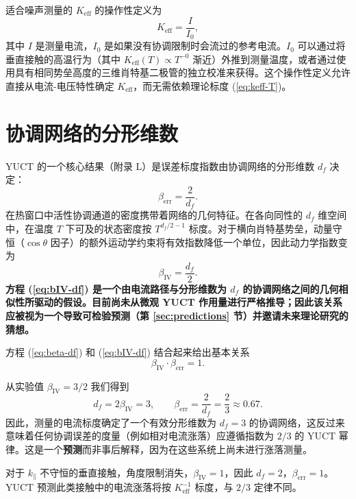 \documentclass[12pt,a4paper]{article}
\newcommand{\Keff}{K_{\mathrm{eff}}}
\begin{document}
	适合噪声测量的 $\Keff$ 的操作性定义为
	\begin{equation}
		\Keff = \frac{I}{I_0},
		\label{eq:keff-operational}
	\end{equation}
	其中 $I$ 是测量电流，$I_0$ 是如果没有协调限制时会流过的参考电流。$I_0$ 可以通过将垂直接触的高温行为（其中 $\Keff(T) \propto T^{-0}$ 渐近）外推到测量温度，或者通过使用具有相同势垒高度的三维肖特基二极管的独立校准来获得。这个操作性定义允许直接从电流-电压特性确定 $\Keff$，而无需依赖理论标度 (\ref{eq:keff-T})。
	
	\section{协调网络的分形维数}
	
	YUCT 的一个核心结果（附录 L）是误差标度指数由协调网络的分形维数 $d_f$ 决定：
	\begin{equation}
		\beta_{\mathrm{err}} = \frac{2}{d_f}.
		\label{eq:beta-df}
	\end{equation}
	在热窗口中活性协调通道的密度携带着网络的几何特征。在各向同性的 $d_f$ 维空间中，在温度 $T$ 下可及的状态密度按 $T^{d_f/2 - 1}$ 标度。对于横向肖特基势垒，动量守恒（$\cos\theta$ 因子）的额外运动学约束将有效指数降低一个单位，因此动力学指数变为
	\begin{equation}
		\beta_{\mathrm{IV}} = \frac{d_f}{2}.
		\label{eq:bIV-df}
	\end{equation}
	\textbf{方程 (\ref{eq:bIV-df}) 是一个由电流路径与分形维数为 $d_f$ 的协调网络之间的几何相似性所驱动的假设。目前尚未从微观 YUCT 作用量进行严格推导；因此该关系应被视为一个导致可检验预测（第 \ref{sec:predictions} 节）并邀请未来理论研究的猜想。}
	
	方程 (\ref{eq:beta-df}) 和 (\ref{eq:bIV-df}) 结合起来给出基本关系
	\begin{equation}
		\boxed{\beta_{\mathrm{IV}} \cdot \beta_{\mathrm{err}} = 1}.
		\label{eq:relation}
	\end{equation}
	
	从实验值 $\beta_{\mathrm{IV}} = 3/2$ 我们得到
	\begin{equation}
		d_f = 2\beta_{\mathrm{IV}} = 3, \qquad
		\beta_{\mathrm{err}} = \frac{2}{d_f} = \frac{2}{3} \approx 0.67.
	\end{equation}
	因此，测量的电流标度确定了一个有效分形维数为 $d_f = 3$ 的协调网络，这反过来意味着任何协调误差的度量（例如相对电流涨落）应遵循指数为 $2/3$ 的 YUCT 幂律。这是一个\textbf{预测}而非事后解释，因为在这些系统上尚未进行涨落测量。
	
	对于 $k_\parallel$ 不守恒的垂直接触，角度限制消失，$\beta_{\mathrm{IV}} = 1$，因此 $d_f = 2$，$\beta_{\mathrm{err}} = 1$。YUCT 预测此类接触中的电流涨落将按 $\Keff^{-1}$ 标度，与 $2/3$ 定律不同。
	
\end{document}
